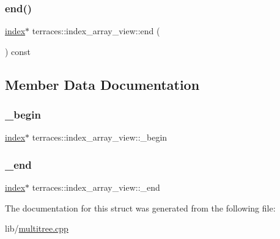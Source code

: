 \mbox{\label{structterraces_1_1index__array__view_aeea66f3e774d119b6be5d473f822568f}} 
\subsubsection{\texorpdfstring{end()}{end()}}
{\footnotesize\ttfamily \hyperlink{namespaceterraces_adbc33ccb543d1634e96d0eb02e472c77}{index}$\ast$ terraces\+::index\+\_\+array\+\_\+view\+::end (\begin{DoxyParamCaption}{ }\end{DoxyParamCaption}) const\hspace{0.3cm}{\ttfamily [inline]}}



\subsection{Member Data Documentation}
\mbox{\label{structterraces_1_1index__array__view_a0ebf54edfffe71f8771fb7f77dcb811e}} 
\subsubsection{\texorpdfstring{\+\_\+begin}{\_begin}}
{\footnotesize\ttfamily \hyperlink{namespaceterraces_adbc33ccb543d1634e96d0eb02e472c77}{index}$\ast$ terraces\+::index\+\_\+array\+\_\+view\+::\+\_\+begin}

\mbox{\label{structterraces_1_1index__array__view_ad12ad0aa47e15385e01b5b993de729e2}} 
\subsubsection{\texorpdfstring{\+\_\+end}{\_end}}
{\footnotesize\ttfamily \hyperlink{namespaceterraces_adbc33ccb543d1634e96d0eb02e472c77}{index}$\ast$ terraces\+::index\+\_\+array\+\_\+view\+::\+\_\+end}



The documentation for this struct was generated from the following file\+:\begin{DoxyCompactItemize}
\item 
lib/\hyperlink{multitree_8cpp}{multitree.\+cpp}\end{DoxyCompactItemize}
